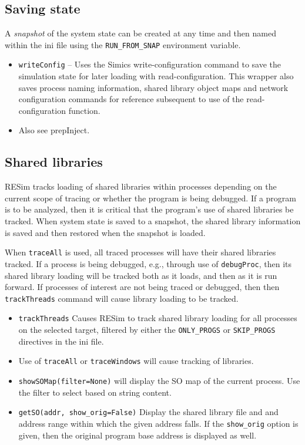 \documentclass[titlepage]{article}
\begin{document}
\subsection{Saving state}
A \textit{snapshot} of the system state can be created at any time and then named within the ini file using the {\tt RUN\_FROM\_SNAP} environment variable.

\begin{itemize}
\item {\tt writeConfig} – Uses the Simics write-configuration command to save the simulation state for later loading with read-configuration.  This wrapper also saves process naming information, shared library object maps and network configuration commands for reference subsequent to use of the read-configuration function.
\item Also see prepInject.
\end{itemize}

\subsection{Shared libraries}
RESim tracks loading of shared libraries within processes depending on the current scope of tracing or whether the program
is being debugged.
If a program is to be analyzed, then it is critical that the program's use of shared libraries be tracked.  When system state is 
saved to a snapshot, the shared library information is saved and then restored when the snapshot is loaded.

When {\tt traceAll} is used, all traced processes will have their shared libraries tracked.  If a process is being debugged, e.g.,
through use of {\tt debugProc}, then its shared library loading will be tracked both as it loads, and then as it is run forward.
If processes of interest are not being traced or debugged, then then {\tt trackThreads} command will cause library loading to be tracked.

\begin{itemize}
\item {\tt trackThreads} Causes RESim to track shared library loading for all processes on the selected target, filtered by either the
{\tt ONLY\_PROGS} or {\tt SKIP\_PROGS} directives in the ini file.
\item Use of {\tt traceAll} or {\tt traceWindows} will cause tracking of libraries.
\item {\tt showSOMap(filter=None)} will display the SO map of the current process.  Use the filter to select based on string content.
\item {\tt getSO(addr, show\_orig=False)} Display the shared library file and and address range within which the given address falls.
If the {\tt show\_orig} option is given, then the original program base address is displayed as well.
\end{itemize}
\end{document}
